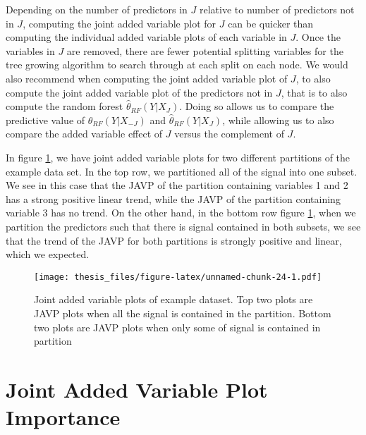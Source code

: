 \documentclass[12pt,twoside]{reedthesis}
\theoremstyle{definition}
\theoremstyle{definition}
\theoremstyle{definition}
\theoremstyle{remark}
\begin{document}
Depending on the number of predictors in \(J\) relative to number of
predictors not in \(J\), computing the joint added variable plot for
\(J\) can be quicker than computing the individual added variable plots
of each variable in \(J\). Once the variables in \(J\) are removed,
there are fewer potential splitting variables for the tree growing
algorithm to search through at each split on each node. We would also
recommend when computing the joint added variable plot of \(J\), to also
compute the joint added variable plot of the predictors not in \(J\),
that is to also compute the random forest \(\hat{\theta}_{RF}(Y|X_J)\).
Doing so allows us to compare the predictive value of
\(\hat{\theta}_{RF}(Y|X_{-J})\) and \(\hat{\theta}_{RF}(Y|X_J)\), while
allowing us to also compare the added variable effect of \(J\) versus
the complement of \(J\). \par

In figure \ref{JAVPex}, we have joint added variable plots for two
different partitions of the example data set. In the top row, we
partitioned all of the signal into one subset. We see in this case that
the JAVP of the partition containing variables 1 and 2 has a strong
positive linear trend, while the JAVP of the partition containing
variable 3 has no trend. On the other hand, in the bottom row figure
\ref{JAVPex}, when we partition the predictors such that there is signal
contained in both subsets, we see that the trend of the JAVP for both
partitions is strongly positive and linear, which we expected. \par
\begin{figure}
\centering
\texttt{[image: thesis\_files/figure-latex/unnamed-chunk-24-1.pdf]}
\caption{\label{fig:unnamed-chunk-24}\label{JAVPex}Joint added variable
plots of example dataset. Top two plots are JAVP plots when all the
signal is contained in the partition. Bottom two plots are JAVP plots
when only some of signal is contained in partition}
\end{figure}
\section{Joint Added Variable Plot
Importance}\label{joint-added-variable-plot-importance-1}
\end{document}
